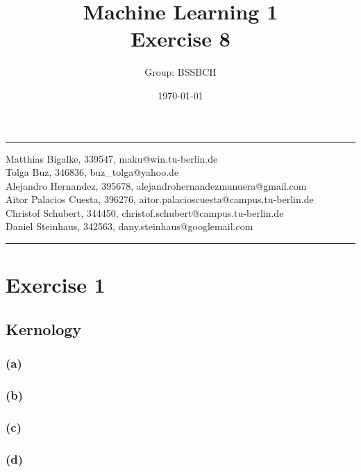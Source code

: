 \documentclass{article}
\title{Machine Learning 1 \\ Exercise 8} %
\author{Group: BSSBCH} %
\date{\today} %
\begin{document}
\maketitle %
\noindent\rule[0.5ex]{\linewidth}{1pt}
Matthias Bigalke, 339547, maku@win.tu-berlin.de \\
Tolga Buz, 346836, buz\_tolga@yahoo.de \\
Alejandro Hernandez, 395678, alejandrohernandezmunuera@gmail.com \\
Aitor Palacios Cuesta, 396276, aitor.palacioscuesta@campus.tu-berlin.de \\
Christof Schubert, 344450, christof.schubert@campus.tu-berlin.de \\
Daniel Steinhaus, 342563, dany.steinhaus@googlemail.com\\
\noindent\rule[0.5ex]{\linewidth}{1pt}


\section*{Exercise 1}

\subsection*{Kernology}

\subsubsection*{(a)}

\subsubsection*{(b)}

\subsubsection*{(c)}

\subsubsection*{(d)}
\end{document}
